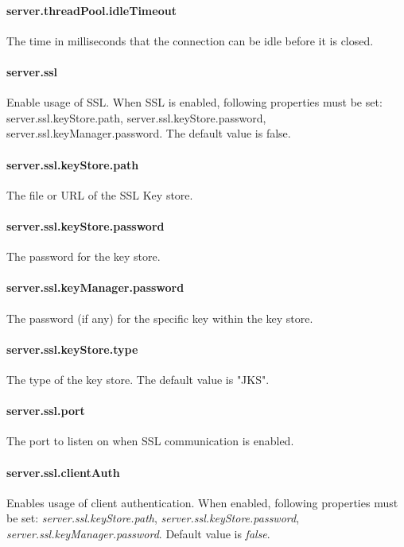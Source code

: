 \paragraph{server.threadPool.idleTimeout}
The time in milliseconds that the connection can be idle before it is closed.

\paragraph{server.ssl}
Enable usage of SSL. When SSL is enabled, following properties must be set:
server.ssl.keyStore.path, server.ssl.keyStore.password, server.ssl.keyManager.password.
The default value is false.

\paragraph{server.ssl.keyStore.path}
The file or URL of the SSL Key store.
\paragraph{server.ssl.keyStore.password}
The password for the key store.
\paragraph{server.ssl.keyManager.password}
The password (if any) for the specific key within the key store.
\paragraph{server.ssl.keyStore.type}
The type of the key store. The default value is "JKS".

\paragraph{server.ssl.port}
The port to listen on when SSL communication is enabled.

\paragraph{server.ssl.clientAuth}
Enables usage of client authentication. When enabled, following properties must
be set: \emph{server.ssl.keyStore.path}, \emph{server.ssl.keyStore.password},
\emph{server.ssl.keyManager.password}. Default value is \emph{false}.

